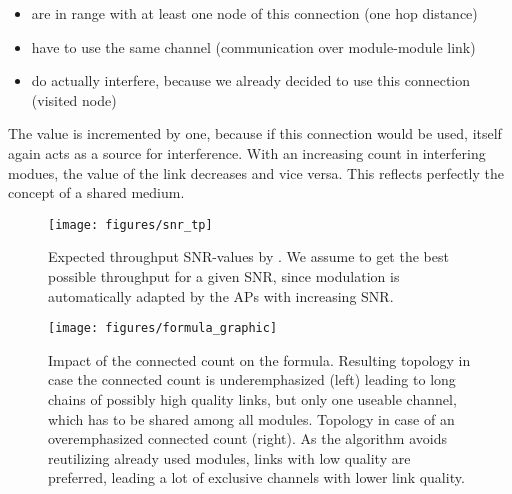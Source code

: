 \begin{description}
	    \begin{itemize}
	    \item are in range with at least one node of this connection (one hop distance)
	    
	    \item have to use the same channel (communication over module-module link)
	    
	    \item do actually interfere, because we already decided to use this connection (visited node)
	    \end{itemize}

	    The value is incremented by one, because if this connection would be used, itself again acts as a source for interference.
	    With an increasing count in interfering modues, the value of the link decreases and vice versa. This reflects perfectly the concept of a shared medium.
	\end{description}
\newpage
	\begin{figure}[h!]
	  \centering
	  \texttt{[image: figures/snr\_tp]}
	  \caption{Expected throughput \ac{SNR}-values by \cite{expected_snr}. We assume to get the best possible throughput for a given SNR, since 
	    modulation is automatically adapted by the APs with increasing SNR.}
	  \label{fig:snr_tp}
	\end{figure}

	\begin{figure}[h!]
	  \centering
	  \texttt{[image: figures/formula\_graphic]}
	  \caption{Impact of the connected count on the formula. Resulting topology in case the connected count is underemphasized (left) leading
	    to long chains of possibly high quality links, but only one useable channel, which has to be shared among all modules.
	    Topology in case of an overemphasized connected count (right). As the algorithm avoids reutilizing already used modules,
	    links with low quality are preferred, leading a lot of exclusive channels with lower link quality.}
	  \label{fig:formula_graphic}
      \end{figure}
\newpage
	
